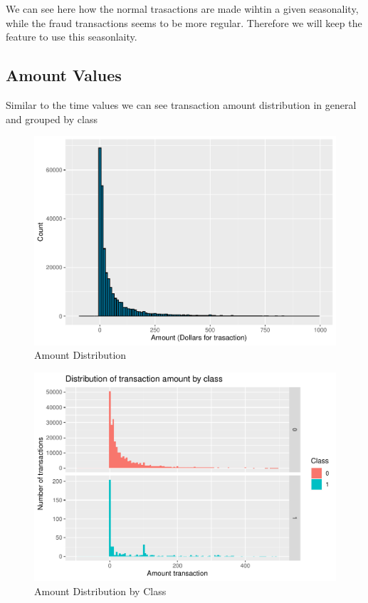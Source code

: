 \documentclass[
]{article}
\begin{document}
We can see here how the normal trasactions are made wihtin a given
seasonality, while the fraud transactions seems to be more regular.
Therefore we will keep the feature to use this seasonlaity.

\hypertarget{amount-values}{%
\subsection{Amount Values}\label{amount-values}}

Similar to the time values we can see transaction amount distribution in
general and grouped by class

\begin{figure}[H]

{\centering \includegraphics[width=0.7\linewidth]{fraudDetectionReport_files/figure-latex/amount_distribution-1} 

}

\caption{Amount Distribution}\label{fig:amount_distribution}
\end{figure}

\begin{figure}[H]

{\centering \includegraphics[width=0.7\linewidth]{fraudDetectionReport_files/figure-latex/amountClass_distribution-1} 

}

\caption{Amount Distribution by Class}\label{fig:amountClass_distribution}
\end{figure}
\end{document}
